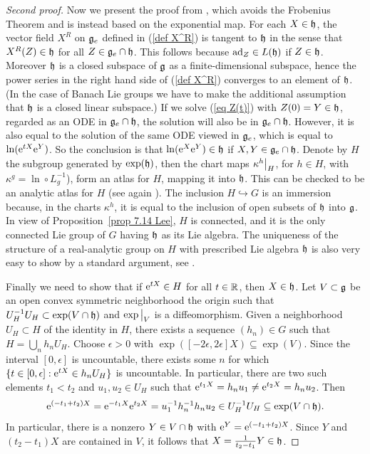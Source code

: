 \begin{proof}[Second proof]
    Now we present the proof from \cite[Thm.~1.10.3]{DK}, which avoids the Frobenius Theorem and is instead based on the exponential map. For each $X\in\mathfrak{h}$, the vector field $X^R$ on $\mathfrak{g}_e$ defined in (\ref{def X^R}) is tangent to $\mathfrak{h}$ in the sense that $X^R(Z)\in\mathfrak{h}$ for all $Z\in\mathfrak{g}_e\cap\mathfrak{h}$. This follows because $\mathrm{ad}_Z\in\boldsymbol{\mathrm{\mathrm}}{L}(\mathfrak{h})$ if $Z\in\mathfrak{h}$. Moreover $\mathfrak{h}$ is a closed subspace of $\mathfrak{g}$ as a finite-dimensional subspace, hence the power series in the right hand side of (\ref{def X^R}) converges to an element of $\mathfrak{h}$. (In the case of Banach Lie groups we have to make the additional assumption that $\mathfrak{h}$ is a closed linear subspace.) If we solve (\ref{eq Z(t)}) with $Z(0)=Y\in\mathfrak{h}$, regarded as an ODE in $\mathfrak{g}_e\cap\mathfrak{h}$, the solution will also be in $\mathfrak{g}_e\cap\mathfrak{h}$. However, it is also equal to the solution of the same ODE viewed in $\mathfrak{g}_e$, which is equal to $\ln(\mathrm{e}^{tX}\mathrm{e}^Y)$. So the conclusion is that $\ln(\mathrm{e}^X\mathrm{e}^Y)\in\mathfrak{h}$ if $X,Y\in\mathfrak{g}_e\cap\mathfrak{h}$. Denote by $H$ the subgroup generated by $\exp(\mathfrak{h})$, then the chart maps $\restr{\kappa^h}{H}$, for $h\in H$, with $\kappa^g=\ln\circ L_g^{-1}$), form an atlas for $H$, mapping it into $\mathfrak{h}$. This can be checked to be an analytic atlas for $H$ (see again \cite[Thm.~1.6.3]{DK}). The inclusion $H\hookrightarrow G$ is an immersion because, in the charts $\kappa^h$, it is equal to the inclusion of open subsets of $\mathfrak{h}$ into $\mathfrak{g}$. In view of Proposition~\ref{prop 7.14 Lee}, $H$ is connected, and it is the only connected Lie group of $G$ having $\mathfrak{h}$ as its Lie algebra. The uniqueness of the structure of a real-analytic group on $H$ with prescribed Lie algebra $\mathfrak{h}$ is also very easy to show by a standard argument, see \cite[Prop.~1.6.4]{DK}.

    Finally we need to show that if $\mathrm{e}^{tX}\in H$ for all $t\in\mathbb{R}$, then $X\in\mathfrak{h}$. Let $V\subset\mathfrak{g}$ be an open convex symmetric neighborhood the origin such that $U_H^{-1}U_H\subset \exp(V\cap \mathfrak{h})$ and $\restr{\exp}{V}$ is a diffeomorphism. Given a neighborhood $U_H\subset H$ of the identity in $H$, there exists a sequence $(h_n)\in G$ such that $H=\bigcup_n h_nU_H$. Choose $\epsilon>0$ with $\exp([-2\epsilon,2\epsilon]X)\subseteq \exp(V)$. Since the interval $[0,\epsilon]$ is uncountable, there exists some $n$ for which $\{t\in [0,\epsilon]:\mathrm{e}^{tX}\in h_nU_H\}$ is uncountable. In particular, there are two such elements $t_1<t_2$ and $u_1,u_2\in U_H$ such that $\mathrm{e}^{t_1X}=h_nu_1\neq \mathrm{e}^{t_2X}=h_nu_2$. Then
    \[\mathrm{e}^{(-t_1+t_2)X}=\mathrm{e}^{-t_1X}\mathrm{e}^{t_2X}=u_1^{-1}h_n^{-1}h_nu_2\in U_H^{-1}U_H\subseteq \exp(V\cap\mathfrak{h}).\]
    In particular, there is a nonzero $Y\in V\cap\mathfrak{h}$ with $\mathrm{e}^Y=\mathrm{e}^{(-t_1+t_2)X}$. Since $Y$ and $(t_2-t_1)X$ are contained in $V$, it follows that $X=\frac{1}{t_2-t_1}Y\in\mathfrak{h}$.
 \end{proof}




